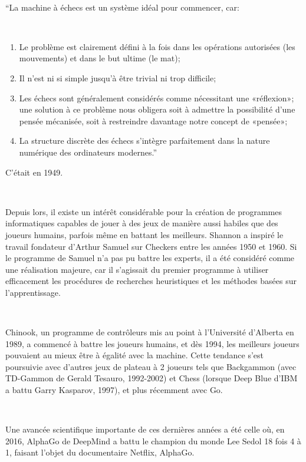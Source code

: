 ~\par
“La machine à échecs est un système idéal pour commencer, car: 

~\par
\begin{enumerate}
\item Le problème est clairement défini à la fois dans les opérations autorisées (les mouvements) et dans le but ultime (le mat); 
\item Il n'est ni si simple jusqu'à être trivial ni trop difficile; 
\item Les échecs sont généralement considérés comme nécessitant une «réflexion»; une solution à ce problème nous obligera soit à admettre la possibilité d'une pensée mécanisée, soit à restreindre davantage notre concept de «pensée»; 
\item La structure discrète des échecs s’intègre parfaitement dans la nature numérique des ordinateurs modernes.”

\end{enumerate}

C'était en 1949.

~\par
Depuis lors, il existe un intérêt considérable pour la création de programmes informatiques capables de jouer à des jeux de manière aussi habiles que des joueurs humains, parfois même en battant les meilleurs. Shannon a inspiré le travail fondateur d’Arthur Samuel sur Checkers entre les années 1950 et 1960. Si le programme de Samuel n’a pas pu battre les experts, il a été considéré comme une réalisation majeure, car il s’agissait du premier programme à utiliser efficacement les procédures de recherches heuristiques et les méthodes basées sur l’apprentissage. \parencite{unity1}


~\par
Chinook, un programme de contrôleurs mis au point à l’Université d'Alberta en 1989, a commencé à battre les joueurs humains, et dès 1994, les meilleurs joueurs pouvaient au mieux être à égalité avec la machine. Cette tendance s’est poursuivie avec d’autres jeux de plateau à 2 joueurs tels que Backgammon (avec TD-Gammon de Gerald Tesauro, 1992-2002) et Chess (lorsque Deep Blue d’IBM a battu Garry Kasparov, 1997), et plus récemment avec Go.

~\par
Une avancée scientifique importante de ces dernières années a été celle où, en 2016, AlphaGo de DeepMind a battu le champion du monde Lee Sedol 18 fois 4 à 1, faisant l’objet du documentaire Netflix, AlphaGo. 


